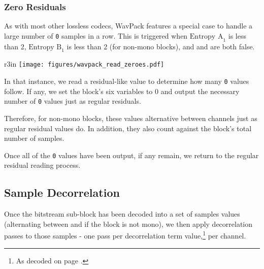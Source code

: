\clearpage

\subsubsection{Zero Residuals}

As with most other lossless codecs, WavPack features a special
case to handle a large number of \texttt{0} samples in a row.
This is triggered when $\text{Entropy A}_1$ is less than 2,
$\text{Entropy B}_1$ is less than 2 (for non-mono blocks),
and  and  are both false.

\begin{wrapfigure}[14]{r}{3in}
\texttt{[image: figures/wavpack\_read\_zeroes.pdf]}
\end{wrapfigure}

In that instance, we read a residual-like value to determine
how many \texttt{0} values follow.
If any, we set the block's six  variables to 0
and output the necessary number of \texttt{0} values just as
regular residuals.

Therefore, for non-mono blocks, these values alternative between channels
just as regular residual values do.
In addition, they also count against the block's total number of samples.

Once all of the \texttt{0} values have been output, if any
 remain, we return to the regular residual
reading process.

\clearpage

\subsection{Sample Decorrelation}

Once the bitstream sub-block has been decoded into a set of
samples values (alternating between  and 
if the block is not mono), we then apply decorrelation passes
to those samples - one pass per decorrelation term value,\footnote{As
decoded on page \pageref{wavpack_decorr_terms}.} per channel.

